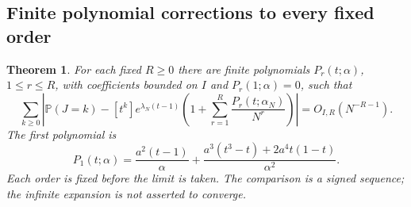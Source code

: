 \documentclass[11pt]{article}
\newtheorem{theorem}{Theorem}[section]
\theoremstyle{definition}
\newcommand{\Prob}{\mathbb P}
\begin{document}
\subsection{Finite polynomial corrections to every fixed order}
\begin{theorem}\label{mct:thm:allTV}
For each fixed $R\ge0$ there are finite polynomials $P_r(t;\alpha)$, $1\le r\le R$, with coefficients bounded on $I$ and $P_r(1;\alpha)=0$, such that
\begin{equation}\label{mct:eq:allTV}
 \sum_{k\ge0}\left|
 \Prob(J=k)-[t^k]e^{\lambda_N(t-1)}
 \left(1+\sum_{r=1}^R\frac{P_r(t;\alpha_N)}{N^r}\right)
 \right|=O_{I,R}(N^{-R-1}).
\end{equation}
The first polynomial is
\begin{equation}\label{mct:eq:P1}
 P_1(t;\alpha)=\frac{a^2(t-1)}{\alpha}
 +\frac{a^3(t^3-t)+2a^4t(1-t)}{\alpha^2}.
\end{equation}
Each order is fixed before the limit is taken. The comparison is a signed sequence; the infinite expansion is not asserted to converge.
\end{theorem}
\end{document}
